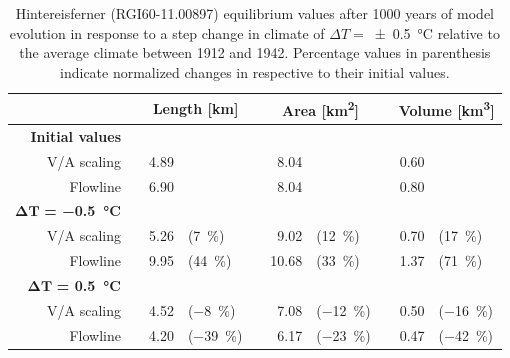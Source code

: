        \begin{table}[htp]
          \centering
          \small
          \caption{Hintereisferner (RGI60-11.00897) equilibrium values after 1000 years of model evolution in response to a step change in climate of $\Delta T = $\SI{\pm0.5}{\celsius} relative to the average climate between 1912 and 1942. Percentage values in parenthesis indicate normalized changes in respective to their initial values.}
          \label{tab:hintereisferner_equilibrium_values}
          \begin{tabular}{@{}rcrlcrlcrl@{}}
            \toprule
            {} & \phantom{a} & \multicolumn{2}{c}{\textbf{Length [\si{\kilo\meter}]}} & \phantom{a} & \multicolumn{2}{c}{\textbf{Area [\si{\square\kilo\meter}]}} & \phantom{a} & \multicolumn{2}{c}{\textbf{Volume [\si{\cubic\kilo\meter}]}} \\
            \midrule
            \textbf{Initial values} \\
            V/A scaling & \phantom{a} & 4.89 & & \phantom{a} & 8.04 & & \phantom{a} & 0.60 & \\
            Flowline & \phantom{a} &  6.90 & & \phantom{a} & 8.04 & & \phantom{a} & 0.80 & \\
            $\bm{\Delta T}$\textbf{ = \SI{-0.5}{\celsius}} \\
            V/A scaling & \phantom{a} & 5.26 & (\SI{+7}{\percent}) & \phantom{a} & 9.02 & (\SI{+12}{\percent}) & \phantom{a} & 0.70 & (\SI{+17}{\percent}) \\
            Flowline & \phantom{a} &  9.95 & (\SI{+44}{\percent}) & \phantom{a} & 10.68 & (\SI{+33}{\percent}) & \phantom{a} &  1.37 & (\SI{+71}{\percent}) \\
            \addlinespace
            $\bm{\Delta T}$\textbf{ = \SI{+0.5}{\celsius}} \\
            V/A scaling & \phantom{a} & 4.52 & (\SI{-8}{\percent}) & \phantom{a} & 7.08 & (\SI{-12}{\percent}) & \phantom{a} & 0.50 & (\SI{-16}{\percent}) \\
            Flowline & \phantom{a} &   4.20 & (\SI{-39}{\percent}) & \phantom{a} & 6.17 & (\SI{-23}{\percent}) & \phantom{a} & 0.47 & (\SI{-42}{\percent}) \\
            \bottomrule
          \end{tabular}
        \end{table}

